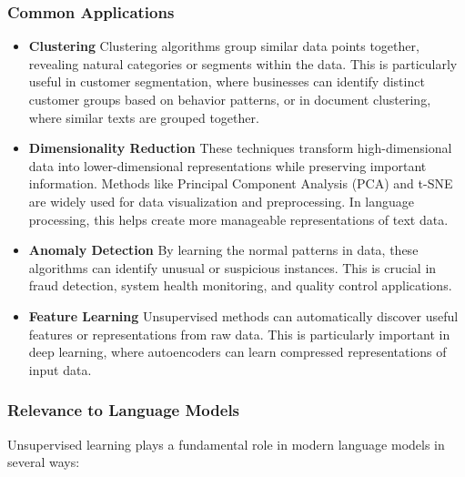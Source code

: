 \subsubsection{Common Applications}
\begin{itemize}[noitemsep]
    \item \textbf{Clustering}
    Clustering algorithms group similar data points together, revealing natural categories or segments within the data. This is particularly useful in customer segmentation, where businesses can identify distinct customer groups based on behavior patterns, or in document clustering, where similar texts are grouped together.
    
    \item \textbf{Dimensionality Reduction}
    These techniques transform high-dimensional data into lower-dimensional representations while preserving important information. Methods like Principal Component Analysis (PCA) and t-SNE are widely used for data visualization and preprocessing. In language processing, this helps create more manageable representations of text data.
    
    \item \textbf{Anomaly Detection}
    By learning the normal patterns in data, these algorithms can identify unusual or suspicious instances. This is crucial in fraud detection, system health monitoring, and quality control applications.
    
    \item \textbf{Feature Learning}
    Unsupervised methods can automatically discover useful features or representations from raw data. This is particularly important in deep learning, where autoencoders can learn compressed representations of input data.
\end{itemize}

\subsubsection{Relevance to Language Models}
\noindent
Unsupervised learning plays a fundamental role in modern language models in several ways:

